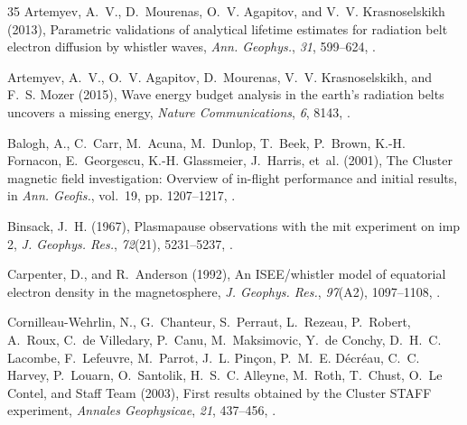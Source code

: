 \documentclass[a4paper]{article}
\renewenvironment{thebibliography}[1]{\begin{oldthebibliography}{#1}\setlength{\parskip}{0ex}\setlength{\itemsep}{0ex}}{\end{oldthebibliography}}
\begin{document}
\begin{thebibliography}{35}
{Artemyev}, A.~V., D.~{Mourenas}, O.~V. {Agapitov}, and V.~V. {Krasnoselskikh}
  (2013), Parametric validations of analytical lifetime estimates for radiation
  belt electron diffusion by whistler waves, \textit{Ann. Geophys.},
  \textit{31}, 599--624, .

{Artemyev}, A.~V., O.~V. {Agapitov}, D.~{Mourenas}, V.~V. {Krasnoselskikh}, and
  F.~S. {Mozer} (2015), Wave energy budget analysis in the earth's radiation
  belts uncovers a missing energy, \textit{Nature Communications}, \textit{6},
  8143, .

Balogh, A., C.~Carr, M.~Acuna, M.~Dunlop, T.~Beek, P.~Brown, K.-H. Fornacon,
  E.~Georgescu, K.-H. Glassmeier, J.~Harris, et~al. (2001), The {Cluster}
  magnetic field investigation: Overview of in-flight performance and initial
  results, in \textit{Ann. Geofis.}, vol.~19, pp. 1207--1217,
  .

Binsack, J.~H. (1967), Plasmapause observations with the mit experiment on imp
  2, \textit{J. Geophys. Res.}, \textit{72}(21), 5231--5237,
  .

Carpenter, D., and R.~Anderson (1992), An {ISEE}/whistler model of equatorial
  electron density in the magnetosphere, \textit{J. Geophys. Res.},
  \textit{97}(A2), 1097--1108, .

{Cornilleau-Wehrlin}, N., G.~{Chanteur}, S.~{Perraut}, L.~{Rezeau},
  P.~{Robert}, A.~{Roux}, C.~{de Villedary}, P.~{Canu}, M.~{Maksimovic}, Y.~{de
  Conchy}, D.~H.~C. {Lacombe}, F.~{Lefeuvre}, M.~{Parrot}, J.~L. {Pin{\c c}on},
  P.~M.~E. {D{\'e}cr{\'e}au}, C.~C. {Harvey}, P.~{Louarn}, O.~{Santolik},
  H.~S.~C. {Alleyne}, M.~{Roth}, T.~{Chust}, O.~{Le Contel}, and {Staff Team}
  (2003), {First results obtained by the {Cluster} {STAFF} experiment},
  \textit{Annales Geophysicae}, \textit{21}, 437--456,
  .


\end{thebibliography}
\end{document}
